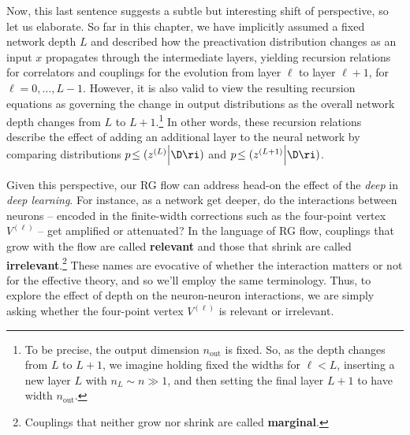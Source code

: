 Now, this last sentence suggests a subtle but interesting shift of perspective, so let us elaborate.
So far in this chapter, we have implicitly assumed a fixed network depth $L$ and described how the preactivation distribution changes as an input $x$ propagates through the intermediate layers, yielding recursion relations for correlators and couplings for the evolution from layer $\ell$ to layer $\ell+1$, for $\ell=0,\ldots,L-1$.
However, it is also valid to view the resulting recursion equations as governing the change in output distributions as the overall network depth changes from $L$ to $L+1$.\footnote{To be precise, the output dimension $n_{\text{out}}$ is fixed. So, as the depth changes from $L$ to $L+1$, we imagine holding fixed the widths for $\ell<L$, inserting a new layer $L$ with $n_L \sim n\gg1$, and then setting the final layer $L+1$ to have width $n_{\text{out}}$.}
In other words, these recursion relations describe the effect of adding an additional layer to the neural network by comparing distributions $p\!\le(z^{(L)}\Big\vert\D\ri)$ and $p\!\le(z^{(L+1)}\Big\vert\D\ri)$.

Given this perspective, our RG flow can address head-on the effect of the \emph{deep} in \emph{deep learning}.
For instance, as a network get deeper, do the interactions between neurons -- encoded in the finite-width corrections such as the four-point vertex $V^{(\ell)}$ -- get amplified or attenuated?
In the language of RG flow,  couplings that grow with the flow are called \textbf{relevant} and those that shrink
are called \textbf{irrelevant}.\footnote{Couplings that neither grow nor shrink are called \textbf{marginal}.}
These names are evocative of whether the interaction matters or not for the effective theory, and so we'll employ the same terminology.
Thus, to explore the effect of depth on the neuron-neuron interactions, we are simply asking whether the four-point vertex  $V^{(\ell)}$ is relevant or irrelevant.


























